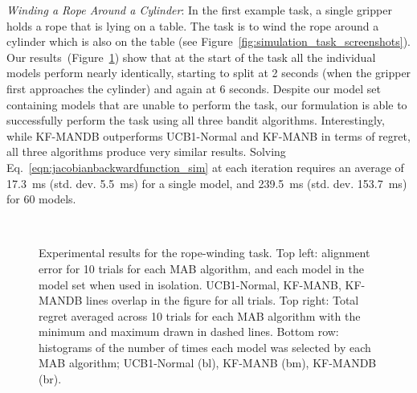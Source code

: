 \textit{Winding a Rope Around a Cylinder}: In the first example task, a single gripper holds a rope that is lying on a table. The task is to wind the rope around a cylinder which is also on the table (see Figure~\ref{fig:simulation_task_screenshots}). Our results~(Figure~\ref{fig:ropecylinder_results}) show that at the start of the task all the individual models perform nearly identically, starting to split at 2 seconds (when the gripper first approaches the cylinder) and again at 6 seconds. Despite our model set containing models that are unable to perform the task, our formulation is able to successfully perform the task using all three bandit algorithms. Interestingly, while KF-MANDB outperforms UCB1-Normal and KF-MANB in terms of regret, all three algorithms produce very similar results. Solving Eq.~\eqref{eqn:jacobianbackwardfunction_sim} at each iteration requires an average of 17.3~ms (std. dev. 5.5~ms) for a single model, and 239.5~ms (std. dev. 153.7~ms) for 60 models.

\begin{figure}[t]
    \centering
    \vspace{-0.1in}
    \\
    \vspace{-0.15in}
    \vspace{-0.1in}
    \caption{Experimental results for the rope-winding task. Top left: alignment error for 10 trials for each MAB algorithm, and each model in the model set when used in isolation. UCB1-Normal, KF-MANB, KF-MANDB lines overlap in the figure for all trials. Top right: Total regret averaged across 10 trials for each MAB algorithm with the minimum and maximum drawn in dashed lines. Bottom row: histograms of the number of times each model was selected by each MAB algorithm; UCB1-Normal (bl), KF-MANB (bm), KF-MANDB (br).}
    \label{fig:ropecylinder_results}
\end{figure}



